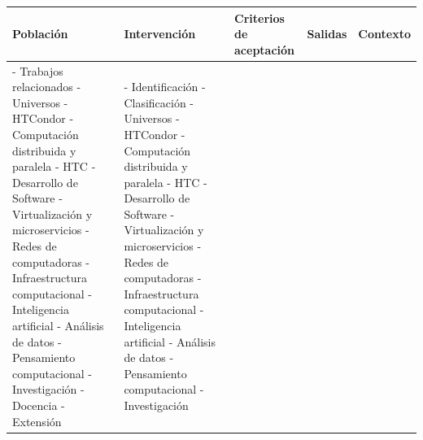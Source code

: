 \begin{table}[H]
	\centering
	\scriptsize
	\setlength{\tabcolsep}{2pt}
	\renewcommand{\arraystretch}{1.2}
	\fontsize{6}{10}\selectfont
	\begin{tabular}{|p{2.8cm}|p{2.8cm}|p{2.0cm}|p{2.8cm}|p{2.8cm}|} %
		\hline
		\textbf{Población}            & \textbf{Intervención} & \textbf{Criterios de aceptación} & \textbf{Salidas} & \textbf{Contexto} \\
		\hline
		- Trabajos relacionados \newline
		- Universos \newline
		- HTCondor \newline
		- Computación distribuida y paralela \newline
		- HTC \newline
		- Desarrollo de Software \newline
		- Virtualización y microservicios \newline
		- Redes de computadoras \newline
		- Infraestructura computacional \newline
		- Inteligencia artificial \newline
		- Análisis de datos \newline
		- Pensamiento computacional \newline
		- Investigación \newline
		- Docencia \newline
		- Extensión                   &
		- Identificación \newline
		- Clasificación \newline
		- Universos \newline
		- HTCondor \newline
		- Computación distribuida y paralela \newline
		- HTC \newline
		- Desarrollo de Software \newline
		- Virtualización y microservicios \newline
		- Redes de computadoras \newline
		- Infraestructura computacional \newline
		- Inteligencia artificial \newline
		- Análisis de datos \newline
		- Pensamiento computacional \newline
		- Investigación \newline

\end{tabular}
\end{table}
